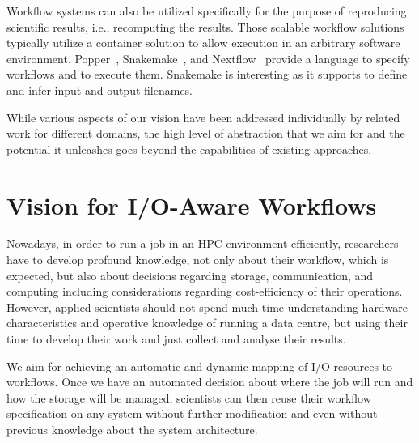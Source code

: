 \documentclass{superfri}
\begin{document}


Workflow systems can also be utilized specifically for the purpose of reproducing scientific results, i.e., recomputing the results.
Those scalable workflow solutions typically utilize a container solution to allow execution in an arbitrary software environment.
Popper~\cite{jimenez2017popper}, Snakemake~\cite{bts480}, and Nextflow~\cite{Nextflow} provide a language to specify workflows and to execute them.
Snakemake is interesting as it supports to define and infer input and output filenames.

While various aspects of our vision have been addressed individually by related work for different domains, the high level of abstraction that we aim for and the potential it unleashes goes beyond the capabilities of existing approaches.


\section{Vision for I/O-Aware Workflows}
\label{sec:vision}

Nowadays, in order to run a job in an HPC environment efficiently, researchers have to develop profound knowledge, not only about their workflow, which is expected, but also about decisions regarding storage, communication, and computing including considerations regarding cost-efficiency of their operations.
However, applied scientists should not spend much time understanding hardware characteristics and operative knowledge of running a data centre, but using their time to develop their work and just collect and analyse their results.

We aim for achieving an automatic and dynamic mapping of I/O resources to workflows.
Once we have an automated decision about where the job will run and how the storage will be managed, scientists can then reuse their workflow specification on any system without further modification and even without previous knowledge about the system architecture.
\end{document}
